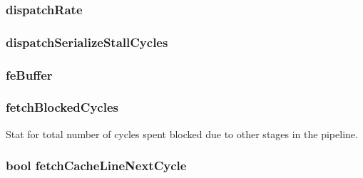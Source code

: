\label{classFrontEnd_a7d0500ec7ced57d9f111842c84317fa6}
\hypertarget{classFrontEnd_a39e060f97b4d1e11037234f7e2620e2a}{
\subsubsection[{dispatchRate}]{ {\bf dispatchRate}}}
\label{classFrontEnd_a39e060f97b4d1e11037234f7e2620e2a}
\hypertarget{classFrontEnd_a0188f971c738223b1be0cac46c0820c0}{
\subsubsection[{dispatchSerializeStallCycles}]{ {\bf dispatchSerializeStallCycles}}}
\label{classFrontEnd_a0188f971c738223b1be0cac46c0820c0}
\hypertarget{classFrontEnd_ac7ded4b035e54069bf829087fd67c780}{
\subsubsection[{feBuffer}]{ {\bf feBuffer}}}
\label{classFrontEnd_ac7ded4b035e54069bf829087fd67c780}
\hypertarget{classFrontEnd_a0501ffad4abed98618a6cf0ba9c3599b}{
\subsubsection[{fetchBlockedCycles}]{ {\bf fetchBlockedCycles}}}
\label{classFrontEnd_a0501ffad4abed98618a6cf0ba9c3599b}
Stat for total number of cycles spent blocked due to other stages in the pipeline. \hypertarget{classFrontEnd_a2bc7884cb20b22f02a5454ca8b6205b6}{
\subsubsection[{fetchCacheLineNextCycle}]{\setlength{\rightskip}{0pt plus 5cm}bool {\bf fetchCacheLineNextCycle}}}
